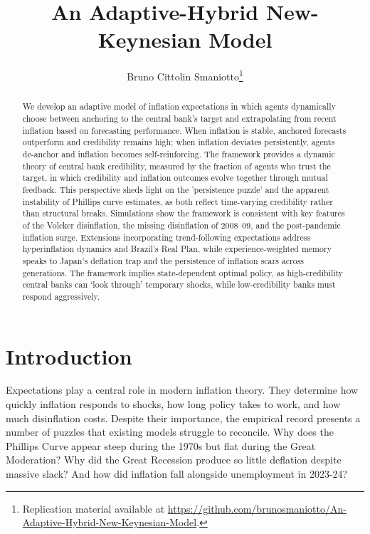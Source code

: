 \documentclass[10pt]{article}
\author{Bruno Cittolin Smaniotto\thanks{Replication material available at \url{https://github.com/brunosmaniotto/An-Adaptive-Hybrid-New-Keynesian-Model}.}}
\date{}
\begin{document}
\title{An Adaptive-Hybrid New-Keynesian Model}

\maketitle

\begin{abstract}
We develop an adaptive model of inflation expectations in which agents dynamically choose between anchoring to the central bank's target and extrapolating from recent inflation based on forecasting performance. When inflation is stable, anchored forecasts outperform and credibility remains high; when inflation deviates persistently, agents de-anchor and inflation becomes self-reinforcing. The framework provides a dynamic theory of central bank credibility, measured by the fraction of agents who trust the target, in which credibility and inflation outcomes evolve together through mutual feedback. This perspective sheds light on the 'persistence puzzle' and the apparent instability of Phillips curve estimates, as both reflect time-varying credibility rather than structural breaks. Simulations show the framework is consistent with key features of the Volcker disinflation, the missing disinflation of 2008--09, and the post-pandemic inflation surge. Extensions incorporating trend-following expectations address hyperinflation dynamics and Brazil's Real Plan, while experience-weighted memory speaks to Japan's deflation trap and the persistence of inflation scars across generations. The framework implies state-dependent optimal policy, as high-credibility central banks can `look through' temporary shocks, while low-credibility banks must respond aggressively.
\end{abstract}

\newpage

\section{Introduction}

Expectations play a central role in modern inflation theory. They determine how quickly inflation responds to shocks, how long policy takes to work, and how much disinflation costs. Despite their importance, the empirical record presents a number of puzzles that existing models struggle to reconcile. Why does the Phillips Curve appear steep during the 1970s but flat during the Great Moderation? Why did the Great Recession produce so little deflation despite massive slack? And how did inflation fall alongside unemployment in 2023-24? 
\end{document}
